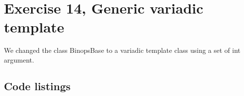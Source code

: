 \documentclass[11pt]{article}
\begin{document}
\section*{Exercise 14, Generic variadic template }
We changed the class BinopsBase to a variadic template class using a set of int argument.

\subsection*{Code listings}






\end{document}
